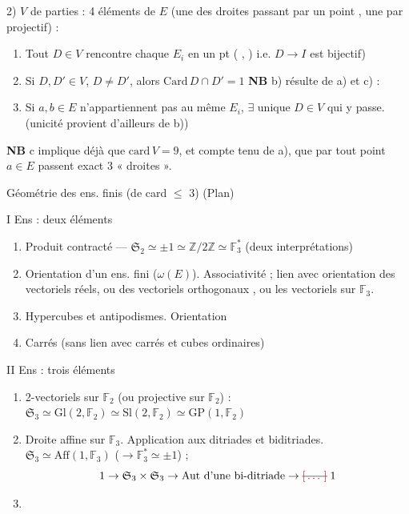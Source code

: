 \documentclass[11pt,a4paper]{article}
\begin{document}
2)  $V$ de parties : 4 éléments de $E$ (une des droites passant par un point , une par projectif) :
\begin{enumerate}
  \item[a)] Tout \struck{\ill{}} $D \in V$ rencontre chaque $E_i$ en un pt  (\struck{\ill{}} , \struck{\ill{}} )  i.e. $D \to I$ est bijectif)
  \item[b)] Si $D, D' \in V$, $D \neq D'$, alors $\mathrm{Card}\, D \cap D' = 1$ \quad \textbf{NB} b) résulte de a) et c) : \ill{}
  \item[c)] Si $a, b \in E$ n'appartiennent pas au même $E_i$, $\exists$ unique $D \in V$ qui y passe. (unicité provient d'ailleurs de b))
\end{enumerate}
\textbf{NB} c implique déjà que $\mathrm{card}\, V = 9$, et compte tenu de a), que par tout point $a \in E$ passent exact 3 « droites ».



Géométrie des ens. finis (de card $\leqslant$ 3) (Plan)

I Ens : deux éléments
\begin{enumerate}
  \item Produit contracté — $\mathfrak{S}_2 \simeq \pm 1 \simeq \mathbb{Z}/2\mathbb{Z} \simeq \mathbb{F}_3^*$ (deux interprétations)
  \item {} Orientation d'un ens. fini ($\omega(E)$). Associativité ; lien avec orientation des vectoriels réels, ou des vectoriels orthogonaux , ou les vectoriels sur $\mathbb{F}_3$.
  \item Hypercubes et antipodismes. Orientation 
  \item Carrés (sans lien avec carrés et cubes ordinaires)
\end{enumerate}

II Ens : trois éléments
\begin{enumerate}
  \item 2-vectoriels sur $\mathbb{F}_2$ (ou  \struck{\ill{}} projective sur $\mathbb{F}_2$) : $\mathfrak{S}_3 \simeq \mathrm{Gl}(2, \mathbb{F}_2) \simeq \mathrm{Sl}(2, \mathbb{F}_2) \simeq \mathrm{GP}(1, \mathbb{F}_2)$
  \item Droite affine sur $\mathbb{F}_3$. Application aux ditriades et biditriades. $\mathfrak{S}_3 \simeq \mathrm{Aff}(1, \mathbb{F}_3)$ ($\to \mathbb{F}_3^* \simeq \pm 1$) ;
  \[
    1 \to \mathfrak{S}_3 \times \mathfrak{S}_3 \to \mathrm{Aut} \text{ d'une bi-ditriade} \to \text{\struck{\ill{}}}\; 1
  \]
  \item {}
\end{enumerate}
\end{document}
